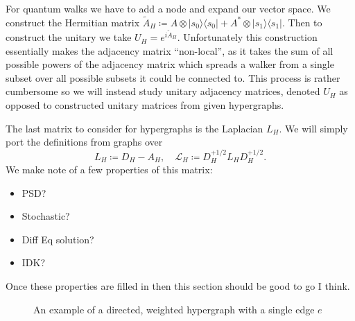 \documentclass{article}
\newcommand{\ket}[1]{|#1\rangle}
\newcommand{\bra}[1]{\langle #1|}
\newcommand{\base}[1]{\ket{s_{#1}}}
\newcommand{\dual}[1]{\bra{s_{#1}}}
\begin{document}
For quantum walks we have to add a node and expand our vector space. We construct the Hermitian matrix $\widetilde{A}_H \coloneqq A \otimes \base{0}\dual{0} + A^* \otimes \base{1} \dual{1}$. Then to construct the unitary we take $U_H = e^{i\widetilde{A}_H}$. Unfortunately this construction essentially makes the adjacency matrix ``non-local'', as it takes the sum of all possible powers of the adjacency matrix which spreads a walker from a single subset over all possible subsets it could be connected to. This process is rather cumbersome so we will instead study unitary adjacency matrices, denoted $U_H$ as opposed to constructed unitary matrices from given hypergraphs.

The last matrix to consider for hypergraphs is the Laplacian $L_H$. We will simply port the definitions from graphs over
\begin{equation}
    L_H \coloneqq D_H - A_H, \quad \mathcal{L}_H \coloneqq D_H^{+1/2} L_H D_H^{+1/2}.
\end{equation}
We make note of a few properties of this matrix:
\begin{itemize}
    \item PSD?
    \item Stochastic?
    \item Diff Eq solution?
    \item IDK?
\end{itemize}
Once these properties are filled in then this section should be good to go I think.

\begin{figure}
    \centering
    \caption[Hypergraph]{An example of a directed, weighted hypergraph with a single edge $e$}
\end{figure}
\end{document}
